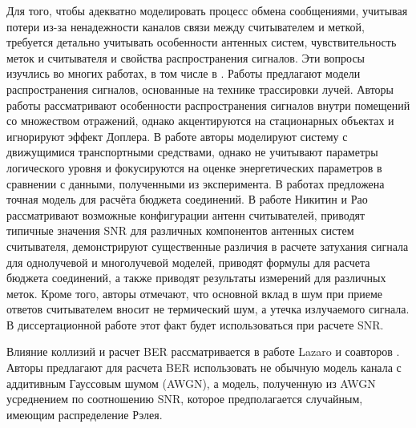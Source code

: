 Для того, чтобы адекватно моделировать процесс обмена сообщениями, учитывая потери из-за ненадежности каналов связи между считывателем и меткой, требуется детально учитывать особенности антенных систем, чувствительность меток и считывателя и свойства распространения сигналов. Эти вопросы изучлись во многих работах, в том числе в \cite{Dimitriou2014, Azpilicueta2016,  Griffin2009,  Nikitin2012, Nikitin2009, Nikitin2008, Nikitin2007, Nikitin2006, Nikitin2006a, Rao2005, Zanetti2010}. Работы \cite{Dimitriou2014, Azpilicueta2016} предлагают модели распространения сигналов, основанные на технике трассировки лучей. Авторы работы \cite{Dimitriou2014} рассматривают особенности распространения сигналов внутри помещений со множеством отражений, однако акцентируются на стационарных объектах и игнорируют эффект Доплера. В работе \cite{Azpilicueta2016} авторы моделируют систему с движущимися транспортными средствами, однако не учитывают параметры логического уровня и фокусируются на оценке энергетических параметров в сравнении с данными, полученными из эксперимента. В работах \cite{Nikitin2008, Griffin2009} предложена точная модель для расчёта бюджета соединений. В работе \cite{Nikitin2008} Никитин и Рао рассматривают возможные конфигурации антенн считывателей, приводят типичные значения SNR для различных компонентов антенных систем считывателя, демонстрируют существенные различия в расчете затухания сигнала для однолучевой и многолучевой моделей, приводят формулы для расчета бюджета соединений, а также приводят результаты измерений для различных меток. Кроме того, авторы отмечают, что основной вклад в шум при приеме ответов считывателем вносит не термический шум, а утечка излучаемого сигнала. В диссертационной работе этот факт будет использоваться при расчете SNR.

Влияние коллизий и расчет BER рассматривается в работе Lazaro и соавторов \cite{Lazaro2009}. Авторы предлагают для расчета BER использовать не обычную модель канала с аддитивным Гауссовым шумом (AWGN), а модель, полученную из AWGN усреднением по соотношению SNR, которое предполагается случайным, имеющим распределение Рэлея.

